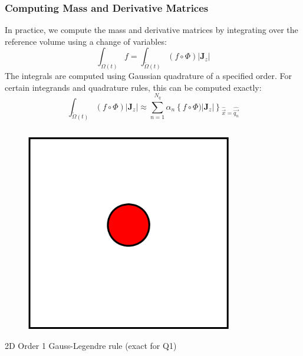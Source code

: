 \documentclass[8pt,xcolor=svgnames]{beamer}
\begin{document}
 
\begin{frame}
  \frametitle{Computing Mass and Derivative Matrices}
  In practice, we compute the mass and derivative matrices by integrating over the reference volume
  using a change of variables:
  \[
  \int_{\Omega(t)} f = \int_{\tilde{\Omega}(t)}(f\circ\Phi)|{\mathbf{J}_z}|
  \]
  The integrals are computed using Gaussian quadrature of a specified order. For certain integrands and
  quadrature rules, this can be computed exactly:
  \[
  \int_{\tilde{\Omega}(t)}(f\circ\Phi)|{\mathbf{J}_z}|\approx
  \sum_{n=1}^{N_q}\alpha_n\left\{f\circ\Phi)|{\mathbf{J}_z}|\right\}_{\hat{\vec{x}}=\hat{\vec{q_n}}}
  \]
  \begin{columns}[T]
  \begin{column}{0.2\textwidth}
    \begin{figure}[h!]
      \centering
      \includegraphics[width=1.0\textwidth,keepaspectratio=true]{./Images/quad1.png}
      \end{figure}
      \centering
      \tiny{2D Order 1
	Gauss-Legendre rule
	(exact for Q1)}
  \end{column}
  \begin{column}{0.2\textwidth}
    \begin{figure}[h!]
      \centering

\end{figure}
\end{column}
\end{columns}
\end{frame}
\end{document}
